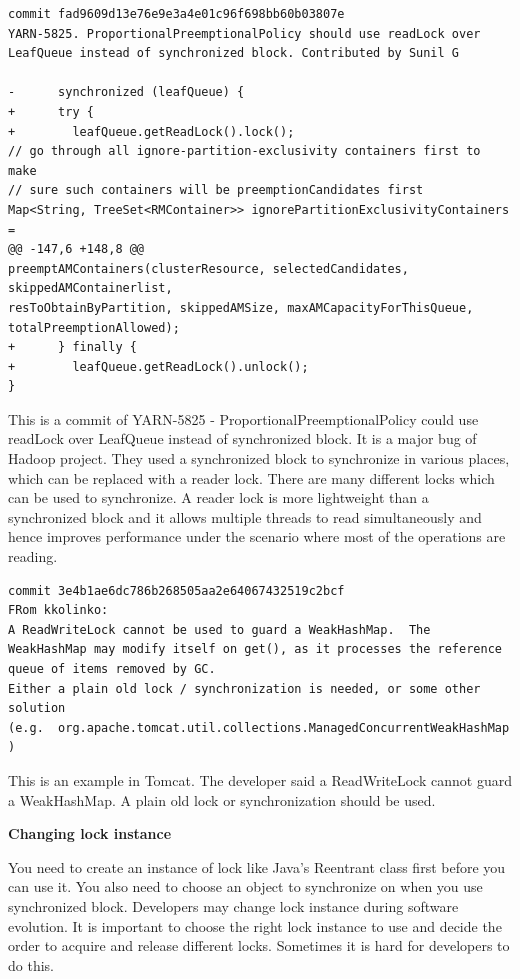\documentclass[conference]{IEEEtran}
\begin{document}
\begin{lstlisting}
commit fad9609d13e76e9e3a4e01c96f698bb60b03807e
YARN-5825. ProportionalPreemptionalPolicy should use readLock over LeafQueue instead of synchronized block. Contributed by Sunil G

-      synchronized (leafQueue) {
+      try {
+        leafQueue.getReadLock().lock();
// go through all ignore-partition-exclusivity containers first to make
// sure such containers will be preemptionCandidates first
Map<String, TreeSet<RMContainer>> ignorePartitionExclusivityContainers =
@@ -147,6 +148,8 @@
preemptAMContainers(clusterResource, selectedCandidates, skippedAMContainerlist,
resToObtainByPartition, skippedAMSize, maxAMCapacityForThisQueue,
totalPreemptionAllowed);
+      } finally {
+        leafQueue.getReadLock().unlock();
}
\end{lstlisting}

This is a commit of YARN-5825 - ProportionalPreemptionalPolicy could use readLock over LeafQueue instead of synchronized block. It is a major bug of Hadoop project. They used a synchronized block to synchronize in various places, which can be replaced with a reader lock. There are many different locks which can be used to synchronize. A reader lock is more lightweight than a synchronized block and it allows multiple threads to read simultaneously and hence improves performance under the scenario where most of the operations are reading.

\begin{lstlisting}
commit 3e4b1ae6dc786b268505aa2e64067432519c2bcf
FRom kkolinko:
A ReadWriteLock cannot be used to guard a WeakHashMap.  The
WeakHashMap may modify itself on get(), as it processes the reference
queue of items removed by GC.
Either a plain old lock / synchronization is needed, or some other solution
(e.g.  org.apache.tomcat.util.collections.ManagedConcurrentWeakHashMap )
\end{lstlisting}

This is an example in Tomcat. The developer said a ReadWriteLock cannot guard a WeakHashMap. A plain old lock or synchronization should be used.

\textbf{Changing lock instance}

You need to create an instance of lock like Java's Reentrant class first before you can use it. You also need to choose an object to synchronize on when you use synchronized block. Developers may change lock instance during software evolution. It is important to choose the right lock instance to use and decide the order to acquire and release different locks. Sometimes it is hard for developers to do this.
\end{document}
